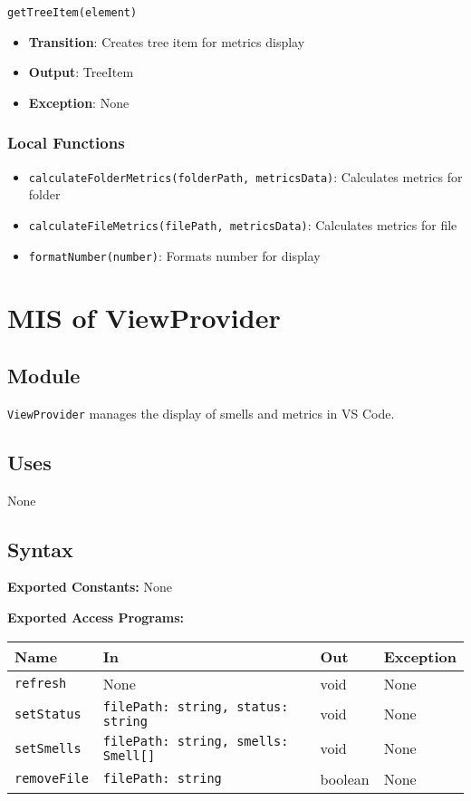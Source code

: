 \documentclass[12pt, titlepage]{article}
\begin{document}
\texttt{getTreeItem(element)}
\begin{itemize}
\item \textbf{Transition}: Creates tree item for metrics display
\item \textbf{Output}: TreeItem
\item \textbf{Exception}: None
\end{itemize}

\subsubsection{Local Functions}
\begin{itemize}
\item \texttt{calculateFolderMetrics(folderPath, metricsData)}: Calculates metrics for folder
\item \texttt{calculateFileMetrics(filePath, metricsData)}: Calculates metrics for file
\item \texttt{formatNumber(number)}: Formats number for display
\end{itemize}

\section{MIS of ViewProvider}

\subsection{Module}
\texttt{ViewProvider} manages the display of smells and metrics in VS Code.

\subsection{Uses}
None

\subsection{Syntax}

\textbf{Exported Constants:} None

\textbf{Exported Access Programs:}\\
\begin{tabularx}{\linewidth}{|l|>{\raggedright\arraybackslash}X|l|l|}
  \hline
  \textbf{Name} & \textbf{In} & \textbf{Out} & \textbf{Exception} \\
  \hline
  \texttt{refresh} & None & void & None \\ \hline
  \texttt{setStatus} & \texttt{filePath: string, status: string} & void & None \\ \hline
  \texttt{setSmells} & \texttt{filePath: string, smells: Smell[]} & void & None \\ \hline
  \texttt{removeFile} & \texttt{filePath: string} & boolean & None \\
  \hline
\end{tabularx}
\end{document}

